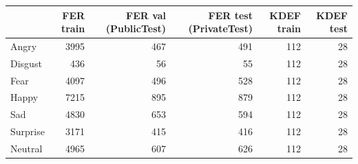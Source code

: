 \begin{tabular}{lrrrrr}
\toprule
 & FER train & FER val (PublicTest) & FER test (PrivateTest) & KDEF train & KDEF test \\
\midrule
Angry & 3995 & 467 & 491 & 112 & 28 \\
Disgust & 436 & 56 & 55 & 112 & 28 \\
Fear & 4097 & 496 & 528 & 112 & 28 \\
Happy & 7215 & 895 & 879 & 112 & 28 \\
Sad & 4830 & 653 & 594 & 112 & 28 \\
Surprise & 3171 & 415 & 416 & 112 & 28 \\
Neutral & 4965 & 607 & 626 & 112 & 28 \\
\bottomrule
\end{tabular}
